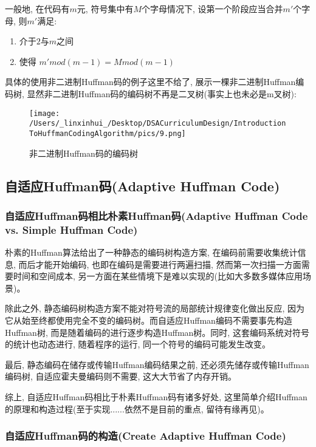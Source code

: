 \documentclass{article}
\begin{document}
\begin{CJK}{UTF8}{gbsn}
一般地, 在代码有\(m\)元, 符号集中有\(M\)个字母情况下, 设第一个阶段应当合并\(m'\)个字母, 则\(m'\)满足:

\begin{enumerate}
\def\labelenumi{\arabic{enumi}.}
\item
  介于\(2\)与\(m\)之间
\item
  使得 \(m'mod(m-1) = Mmod(m-1)\)
\end{enumerate}

具体的使用非二进制Huffman码的例子这里不给了, 展示一棵非二进制Huffman编码树, 显然非二进制Huffman码的编码树不再是二叉树(事实上也未必是m叉树):

\begin{figure}[H]
\centering
\texttt{[image: /Users/\_linxinhui\_/Desktop/DSACurriculumDesign/IntroductionToHuffmanCodingAlgorithm/pics/9.png]}
\caption{非二进制Huffman码的编码树}
\end{figure}

\subsection{自适应Huffman码(Adaptive Huffman Code)}\label{header-n551}
\subsubsection{自适应Huffman码相比朴素Huffman码(Adaptive Huffman Code vs. Simple Huffman Code)}\label{header-n552}

朴素的Huffman算法给出了一种静态的编码树构造方案, 在编码前需要收集统计信息, 而后才能开始编码, 也即在编码是需要进行两遍扫描, 然而第一次扫描一方面需要时间和空间成本, 另一方面在某些情境下是难以实现的(比如大多数多媒体应用场景)。

除此之外, 静态编码树构造方案不能对符号流的局部统计规律变化做出反应, 因为它从始至终都使用完全不变的编码树。而自适应Huffman编码不需要事先构造Huffman树, 而是随着编码的进行逐步构造Huffman树。同时, 这套编码系统对符号的统计也动态进行, 随着程序的运行, 同一个符号的编码可能发生改变。

最后, 静态编码在储存或传输Huffman编码结果之前, 还必须先储存或传输Huffman编码树, 自适应霍夫曼编码则不需要, 这大大节省了内存开销。

综上, 自适应Huffman码相比于朴素Huffman码有诸多好处, 这里简单介绍Huffman的原理和构造过程(至于实现......依然不是目前的重点, 留待有缘再见)。

\subsubsection{自适应Huffman码的构造(Create Adaptive Huffman Code)}\label{header-n557}


\end{CJK}
\end{document}
